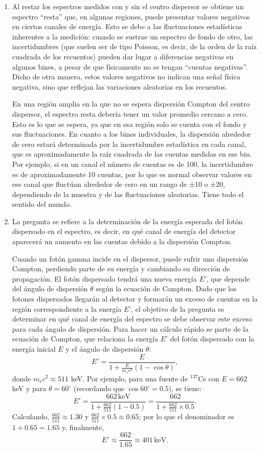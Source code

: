 \documentclass[11pt]{article}
\begin{document}
\begin{enumerate}[label=\alph*)]
    \item Al restar los espectros medidos con y sin el centro dispersor se obtiene un espectro “resta” que, en algunas regiones, puede presentar valores negativos en ciertos canales de energía. Esto se debe a las fluctuaciones estadísticas inherentes a la medición: cuando se sustrae un espectro de fondo de otro, las incertidumbres (que suelen ser de tipo Poisson, es decir, de la orden de la raíz cuadrada de los recuentos) pueden dar lugar a diferencias negativas en algunos bines, a pesar de que físicamente no se tengan “cuentas negativas”. Dicho de otra manera, estos valores negativos no indican una señal física negativa, sino que reflejan las variaciones aleatorias en los recuentos.

    En una región amplia en la que no se espera dispersión Compton del centro dispersor, el espectro resta debería tener un valor promedio cercano a cero. Esto es lo que se espera, ya que en esa región solo se cuenta con el fondo y sus fluctuaciones. En cuanto a los bines individuales, la dispersión alrededor de cero estará determinada por la incertidumbre estadística en cada canal, que es aproximadamente la raíz cuadrada de las cuentas medidas en ese bin. Por ejemplo, si en un canal el número de cuentas es de 100, la incertidumbre es de aproximadamente 10 cuentas, por lo que es normal observar valores en ese canal que fluctúan alrededor de cero en un rango de ±10 o ±20, dependiendo de la muestra y de las fluctuaciones aleatorias. \textcolor{BrickRed}{Tiene todo el sentido del mundo.}

    \item La pregunta se refiere a la determinación de la energía esperada del fotón dispersado en el espectro, es decir, en qué canal de energía del detector aparecerá un aumento en las cuentas debido a la dispersión Compton.

    Cuando un fotón gamma incide en el dispersor, puede sufrir una dispersión Compton, perdiendo parte de su energía y cambiando su dirección de propagación. El fotón dispersado tendrá una nueva energía $E$', que depende del ángulo de dispersión $\theta$ según la ecuación de Compton. Dado que los fotones dispersados llegarán al detector y formarán un exceso de cuentas en la región correspondiente a la energía $E$', el objetivo de la pregunta es determinar en qué canal de energía del espectro se debe observar este exceso para cada ángulo de dispersión. Para hacer un cálculo rápido se parte de la ecuación de Compton, que relaciona la energía \(E\)' del fotón dispersado con la energía inicial \(E\) y el ángulo de dispersión \(\theta\):
    \[
    E' = \frac{E}{1 + \frac{E}{m_e c^2}(1-\cos\theta)},
    \]
    donde \(m_e c^2 \approx 511\) keV. Por ejemplo, para una fuente de \(^{137}\)Cs con \(E=662\) keV y para \(\theta = 60^\circ\) (recordando que \(\cos 60^\circ = 0.5\)), se tiene:
    \[
    E' = \frac{662\,\text{keV}}{1 + \frac{662}{511}(1-0.5)} = \frac{662}{1 + \frac{662}{511}\times0.5}.
    \]
    Calculando, \(\frac{662}{511}\approx 1.30\) y \(\frac{662}{511}\times 0.5 \approx 0.65\); por lo que el denominador es \(1 + 0.65 = 1.65\) y, finalmente, 
    \[
    E' \approx \frac{662}{1.65}\approx 401\,\text{keV}.
    \]
    

\end{enumerate}
\end{document}
